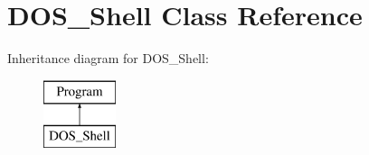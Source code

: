 \hypertarget{classDOS__Shell}{\section{D\-O\-S\-\_\-\-Shell Class Reference}
\label{classDOS__Shell}
}
Inheritance diagram for D\-O\-S\-\_\-\-Shell\-:\begin{figure}[H]
\begin{center}
\leavevmode
\includegraphics[height=2.000000cm]{classDOS__Shell}
\end{center}
\end{figure}
